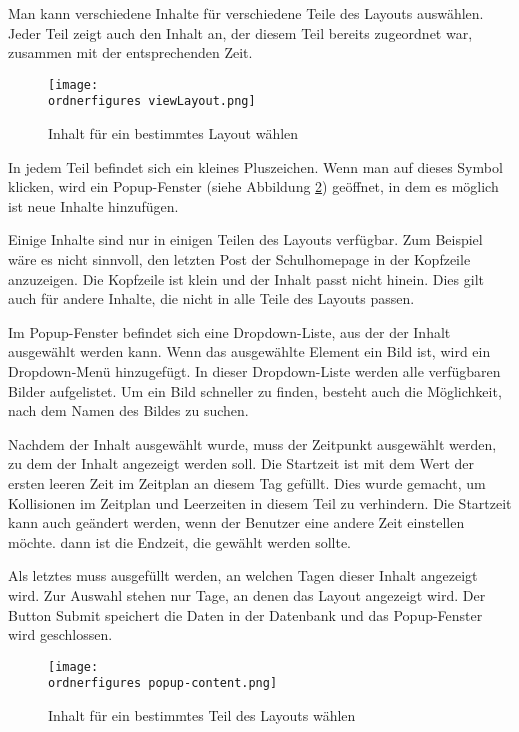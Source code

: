 Man kann verschiedene Inhalte für verschiedene Teile des Layouts auswählen.
Jeder Teil zeigt auch den Inhalt an, der diesem Teil bereits zugeordnet war, zusammen mit der entsprechenden Zeit.

\begin{figure}[H]
	\centering
	\texttt{[image: \\ordnerfigures viewLayout.png]}
	\caption{Inhalt für ein bestimmtes Layout wählen}
	\label{fi:viewLayout}
\end{figure}

In jedem Teil befindet sich ein kleines Pluszeichen. Wenn man auf dieses Symbol klicken, wird ein Popup-Fenster (siehe Abbildung \ref{fi:popup-content}) geöffnet, in dem es m\"oglich ist neue Inhalte hinzufügen.

Einige Inhalte sind nur in einigen Teilen des Layouts verfügbar. Zum Beispiel wäre es nicht sinnvoll, den letzten Post der Schulhomepage in der Kopfzeile anzuzeigen. Die Kopfzeile ist klein und der Inhalt passt nicht hinein. Dies gilt auch für andere Inhalte, die nicht in alle Teile des Layouts passen.

Im Popup-Fenster befindet sich eine Dropdown-Liste, aus der der Inhalt ausgewählt werden kann. Wenn das ausgewählte Element ein Bild ist, wird ein Dropdown-Menü hinzugefügt. In dieser Dropdown-Liste werden alle verfügbaren Bilder aufgelistet. Um ein Bild schneller zu finden, besteht auch die Möglichkeit, nach dem Namen des Bildes zu suchen.

Nachdem der Inhalt ausgewählt wurde, muss der Zeitpunkt ausgewählt werden, zu dem der Inhalt angezeigt werden soll. Die Startzeit ist mit dem Wert der ersten leeren Zeit im Zeitplan an diesem Tag gefüllt. Dies wurde gemacht, um Kollisionen im Zeitplan und Leerzeiten in diesem Teil zu verhindern. Die Startzeit kann auch geändert werden, wenn der Benutzer eine andere Zeit einstellen möchte. dann ist die Endzeit, die gewählt werden sollte.

Als letztes muss ausgefüllt werden, an welchen Tagen dieser Inhalt angezeigt wird. Zur Auswahl stehen nur Tage, an denen das Layout angezeigt wird.
Der Button Submit speichert die Daten in der Datenbank und das Popup-Fenster wird geschlossen.


\begin{figure}[H]
	\centering
	\texttt{[image: \\ordnerfigures popup-content.png]}
	\caption{Inhalt für ein bestimmtes Teil des Layouts wählen}
	\label{fi:popup-content}
\end{figure}


